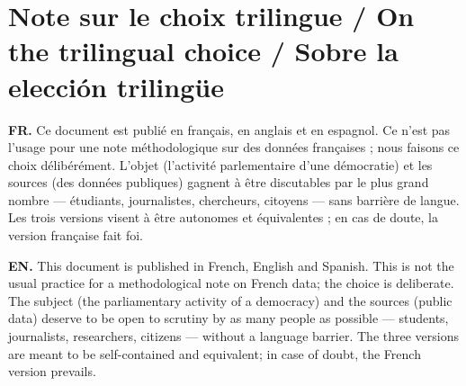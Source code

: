 \documentclass[11pt,a4paper]{article}
\begin{document}
\begin{abstract}
\medskip\noindent\textbf{Resumen (español).} \emph{577deputes.fr} es un sitio web
que ingiere los conjuntos de datos abiertos de la Asamblea Nacional francesa
(XVII\textsuperscript{a} legislatura, desde julio de~2024), del INSEE y del
Ministerio del Interior, y deriva una docena de indicadores: detección de enmiendas
casi idénticas (MinHash~+~LSH) con tipología, cohesión y disciplina de voto, matriz
de cohesión entre grupos, diagrama ternario de bloques, detección de respuestas
ministeriales duplicadas, absentismo estratégico, enmiendas nunca defendidas,
plazos de respuesta, estadísticas por circunscripción. Para cada indicador este
documento ofrece: (i)~su definición formal; (ii)~el algoritmo y los valores de los
parámetros usados; (iii)~un análisis de sensibilidad a esos parámetros; (iv)~una
comparación con la literatura existente; (v)~sus límites. Se acompaña de un script
de cálculo reproducible. El código de la aplicación tiene licencia MIT; los datos
siguen sujetos a la \emph{Licence Ouverte~2.0} (Etalab) de sus productores.

\medskip\noindent\textbf{Mots-clés / Keywords / Palabras clave~:}
parlement, données ouvertes, votes nominaux, cohésion partisane, détection de
réutilisation de texte, MinHash, LSH, questions parlementaires, analyse de
sensibilité, reproductibilité.
\end{abstract}

\section*{Note sur le choix trilingue \textnormal{\small/ On the trilingual choice / Sobre la elección trilingüe}}
\small
\textbf{FR.} Ce document est publié en français, en anglais et en espagnol. Ce
n'est pas l'usage pour une note méthodologique sur des données françaises ; nous
faisons ce choix délibérément. L'objet (l'activité parlementaire d'une démocratie)
et les sources (des données publiques) gagnent à être discutables par le plus grand
nombre — étudiants, journalistes, chercheurs, citoyens — sans barrière de langue.
Les trois versions visent à être autonomes et équivalentes ; en cas de doute, la
version française fait foi.

\textbf{EN.} This document is published in French, English and Spanish. This is
not the usual practice for a methodological note on French data; the choice is
deliberate. The subject (the parliamentary activity of a democracy) and the
sources (public data) deserve to be open to scrutiny by as many people as
possible — students, journalists, researchers, citizens — without a language
barrier. The three versions are meant to be self-contained and equivalent; in
case of doubt, the French version prevails.
\end{document}
